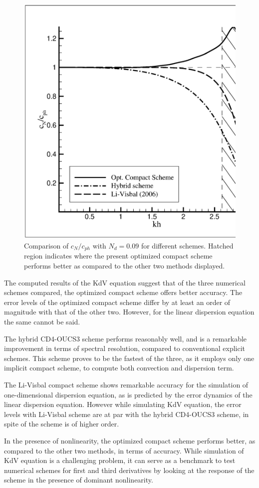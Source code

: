 \documentclass{svjour3}                    %
\begin{document}
\begin{figure}[!h]
\center
\includegraphics[width=0.5\linewidth]{Fig_17}
\caption{Comparison of $c_N/c_{ph}$ with $N_d = 0.09$ for different schemes. Hatched region indicates where the present optimized compact scheme
performs better as compared to the other two methods displayed.}
\label{fig:cn_cph_comp}
\end{figure}

The computed results of the KdV equation suggest that of the three numerical schemes compared, the optimized compact scheme offers better accuracy. The error levels of the optimized compact scheme differ by at least an order of magnitude with that of the other two. However, for the linear dispersion equation the same cannot be said.

 The hybrid CD4-OUCS3 scheme performs reasonably well, and is a remarkable improvement in terms of spectral resolution, compared to conventional explicit schemes. This scheme proves to be the fastest of the three, as it employs only one implicit compact scheme, to compute both convection and dispersion term.
 
 The Li-Visbal compact scheme shows remarkable accuracy for the simulation of one-dimensional dispersion equation, as is predicted by the error dynamics 
of the linear dispersion equation. However while simulating KdV equation, the error levels with Li-Visbal scheme are at par with the hybrid CD4-OUCS3 scheme, in spite of the scheme is of higher order.
 
  In the presence of nonlinearity, the optimized compact scheme performs better, as compared to the other two methods, in terms of accuracy. While simulation of KdV equation is a challenging problem, it can serve as a benchmark to test numerical schemes for first and third derivatives by looking 
at the response of the scheme in the presence of dominant nonlinearity.


%

\end{document}
